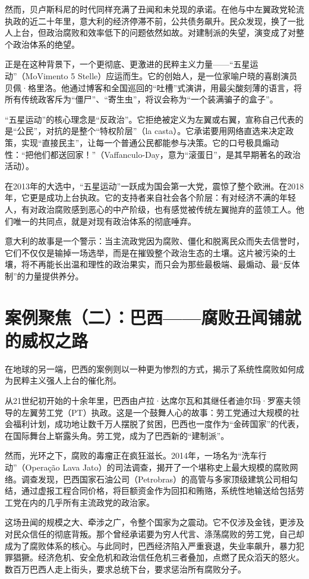 然而，贝卢斯科尼的时代同样充满了丑闻和未兑现的承诺。在他与中左翼政党轮流执政的近二十年里，意大利的经济停滞不前，公共债务飙升。民众发现，换了一批人上台，但政治腐败和效率低下的问题依然如故。对建制派的失望，演变成了对整个政治体系的绝望。

正是在这种背景下，一个更彻底、更激进的民粹主义力量——“五星运动”（MoVimento 5 Stelle）应运而生。它的创始人，是一位家喻户晓的喜剧演员贝佩·格里洛。他通过博客和全国巡回的“吐槽”式演讲，用最尖酸刻薄的语言，将所有传统政客斥为“僵尸”、“寄生虫”，将议会称为“一个装满骗子的盒子”。

“五星运动”的核心理念是“反政治”。它拒绝被定义为左翼或右翼，宣称自己代表的是“公民”，对抗的是整个“特权阶层”（la casta）。它承诺要用网络直选来决定政策，实现“直接民主”，让每一个普通公民都能参与决策。它的口号极具煽动性：“把他们都送回家！”（Vaffanculo-Day，意为“滚蛋日”，是其早期著名的政治活动）。

在2013年的大选中，“五星运动”一跃成为国会第一大党，震惊了整个欧洲。在2018年，它更是成功上台执政。它的支持者来自社会各个阶层：有对经济不满的年轻人，有对政治腐败感到恶心的中产阶级，也有感觉被传统左翼抛弃的蓝领工人。他们唯一的共同点，就是对现有政治体系的彻底唾弃。

意大利的故事是一个警示：当主流政党因为腐败、僵化和脱离民众而失去信誉时，它们不仅仅是输掉一场选举，而是在摧毁整个政治生态的土壤。这片被污染的土壤，将不再能长出温和理性的政治果实，而只会为那些最极端、最煽动、最“反体制”的力量提供养分。

\section{案例聚焦（二）：巴西——腐败丑闻铺就的威权之路}

在地球的另一端，巴西的案例则以一种更为惨烈的方式，揭示了系统性腐败如何成为民粹主义强人上台的催化剂。

从21世纪初开始的十余年里，巴西由卢拉·达席尔瓦和其继任者迪尔玛·罗塞夫领导的左翼劳工党（PT）执政。这是一个鼓舞人心的故事：劳工党通过大规模的社会福利计划，成功地让数千万人摆脱了贫困，巴西也一度作为“金砖国家”的代表，在国际舞台上崭露头角。劳工党，成为了巴西新的“建制派”。

然而，光环之下，腐败的毒瘤正在疯狂滋长。2014年，一场名为“洗车行动”（Operação Lava Jato）的司法调查，揭开了一个堪称史上最大规模的腐败网络。调查发现，巴西国家石油公司（Petrobras）的高管与多家顶级建筑公司相勾结，通过虚报工程合同价格，将巨额资金作为回扣和贿赂，系统性地输送给包括劳工党在内的几乎所有主流政党的政治家。

这场丑闻的规模之大、牵涉之广，令整个国家为之震动。它不仅涉及金钱，更涉及对民众信任的彻底背叛。那个曾经承诺要为穷人代言、涤荡腐败的劳工党，自己却成为了腐败体系的核心。与此同时，巴西经济陷入严重衰退，失业率飙升，暴力犯罪猖獗。经济危机、安全危机和政治信任危机三者叠加，点燃了民众滔天的怒火。数百万巴西人走上街头，要求总统下台，要求惩治所有腐败分子。

